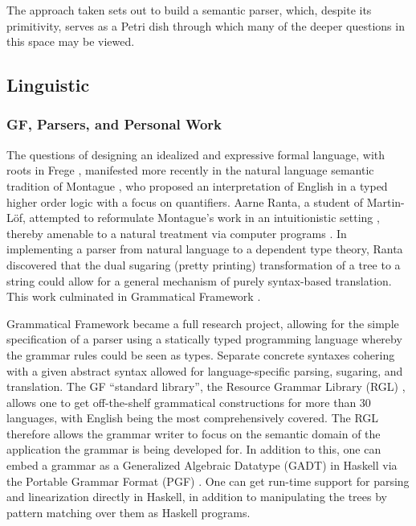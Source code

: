 \documentclass{article}
\begin{document}
The approach taken sets out to build a semantic parser, which, despite its
primitivity, serves as a Petri dish through which many of the deeper questions
in this space may be viewed.

\subsection{Linguistic}

\subsubsection{GF, Parsers, and Personal Work}

The questions of designing an idealized and expressive formal language, with
roots in Frege \cite{frege79}, manifested more recently in the natural language
semantic tradition of Montague \cite{Montague1973}, who proposed an
interpretation of English in a typed higher order logic with a focus on
quantifiers. Aarne Ranta, a student of Martin-Löf, attempted to reformulate
Montague's work in an intuitionistic setting \cite{ranta1994type}, thereby
amenable to a natural treatment via computer programs \cite{ml79}. In
implementing a parser from natural language to a dependent type theory, Ranta
discovered that the dual sugaring (pretty printing) transformation of a tree to
a string could allow for a general mechanism of purely syntax-based translation.
This work culminated in Grammatical Framework \cite{ranta_2004}.

Grammatical Framework became a full research project, allowing for the simple
specification of a parser using a statically typed programming language whereby
the grammar rules could be seen as types. Separate concrete syntaxes cohering
with a given abstract syntax allowed for language-specific parsing, sugaring,
and translation. The GF ``standard library'', the Resource Grammar Library (RGL)
\cite{ranta2009rgl}, allows one to get off-the-shelf grammatical constructions
for more than 30 languages, with English being the most comprehensively covered. The RGL
therefore allows the grammar writer to focus on the semantic domain of the
application the grammar is being developed for. In addition to this, one can
embed a grammar as a Generalized Algebraic Datatype (GADT) in Haskell via the
Portable Grammar Format (PGF) \cite{angelov2010pgf}. One can get run-time
support for parsing and linearization directly in Haskell, in addition to
manipulating the trees by pattern matching over them as Haskell programs.
\end{document}
